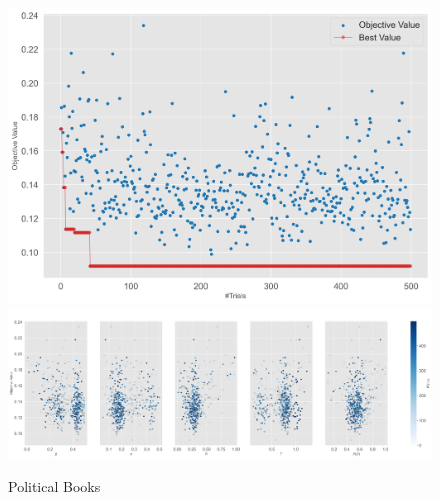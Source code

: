 \documentclass[11pt]{article}
\begin{document}
\begin{figure}[H]
    \centering
    \includegraphics[width=.7\linewidth]{../plots/overall/Optimization_History_polbooks.png}
    \includegraphics[width=.7\linewidth]{../plots/overall/Plot_Slice_polbooks.png}
  \caption{Political Books}
  \label{appendix:optimization_polbooks}
\end{figure}
\end{document}
